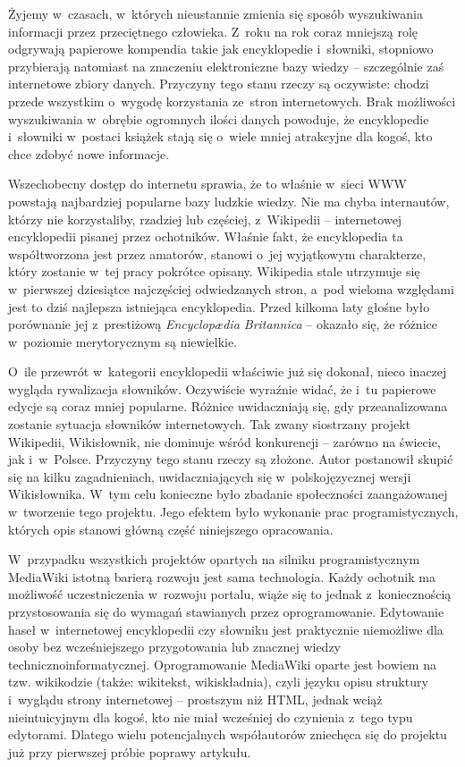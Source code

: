 Żyjemy w~czasach, w~których nieustannie zmienia się sposób wyszukiwania informacji przez przeciętnego człowieka. Z~roku na rok coraz mniejszą rolę odgrywają papierowe kompendia takie jak encyklopedie i~słowniki, stopniowo przybierają natomiast na znaczeniu elektroniczne bazy wiedzy -- szczególnie zaś internetowe zbiory danych. Przyczyny tego stanu rzeczy są oczywiste: chodzi przede wszystkim o~wygodę korzystania ze~stron internetowych. Brak możliwości wyszukiwania w~obrębie ogromnych ilości danych powoduje, że encyklopedie i~słowniki w~postaci książek stają się o~wiele mniej atrakcyjne dla kogoś, kto chce zdobyć nowe informacje.

Wszechobecny dostęp do internetu sprawia, że to właśnie w~sieci WWW powstają najbardziej popularne bazy ludzkie wiedzy. Nie ma chyba internautów, którzy nie korzystaliby, rzadziej lub częściej, z~Wikipedii -- internetowej encyklopedii pisanej przez ochotników. Właśnie fakt, że encyklopedia ta współtworzona jest przez amatorów, stanowi o~jej wyjątkowym charakterze, który zostanie w~tej pracy pokrótce opisany. Wikipedia stale utrzymuje się w~pierwszej dziesiątce najczęściej odwiedzanych stron, a~pod wieloma względami jest to dziś najlepsza istniejąca encyklopedia. Przed kilkoma laty głośne było porównanie jej z~prestiżową \emph{Encyclopædia Britannica} -- okazało się, że różnice w~poziomie merytorycznym są niewielkie.

O~ile przewrót w~kategorii encyklopedii właściwie już się dokonał, nieco inaczej wygląda rywalizacja słowników. Oczywiście wyraźnie widać, że i~tu papierowe edycje są coraz mniej popularne. Różnice uwidaczniają się, gdy przeanalizowana zostanie sytuacja słowników internetowych. Tak zwany siostrzany projekt Wikipedii, Wikisłownik, nie dominuje wśród konkurencji -- zarówno na świecie, jak i~w~Polsce. Przyczyny tego stanu rzeczy są złożone. Autor postanowił skupić się na kilku zagadnieniach, uwidaczniających się w~polskojęzycznej wersji Wikisłownika. W~tym celu konieczne było zbadanie społeczności zaangażowanej w~tworzenie tego projektu. Jego efektem było wykonanie prac programistycznych, których opis stanowi główną część niniejszego opracowania.

W~przypadku wszystkich projektów opartych na silniku programistycznym MediaWiki istotną barierą rozwoju jest sama technologia. Każdy ochotnik ma możliwość uczestniczenia w~rozwoju portalu, wiąże się to jednak z~koniecznością przystosowania się do wymagań stawianych przez oprogramowanie. Edytowanie haseł w~internetowej encyklopedii czy słowniku jest praktycznie niemożliwe dla osoby bez wcześniejszego przygotowania lub znacznej wiedzy techniczno\dywiz{}informatycznej. Oprogramowanie MediaWiki oparte jest bowiem na tzw. wikikodzie (także: wikitekst, wikiskładnia), czyli języku opisu struktury i~wyglądu strony internetowej -- prostszym niż HTML, jednak wciąż nieintuicyjnym dla kogoś, kto nie miał wcześniej do czynienia z~tego typu edytorami. Dlatego wielu potencjalnych współautorów zniechęca się do projektu już przy pierwszej próbie poprawy artykułu.

